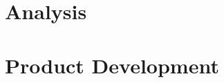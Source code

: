 

{
	\thispagestyle{empty}
	\frame{
  \aauwavesbg
  \finalpage{\insertsection\par}
	}
}
\AtBeginSection{\sectionpage}





\part{Analysis}

\part{Product Development}





